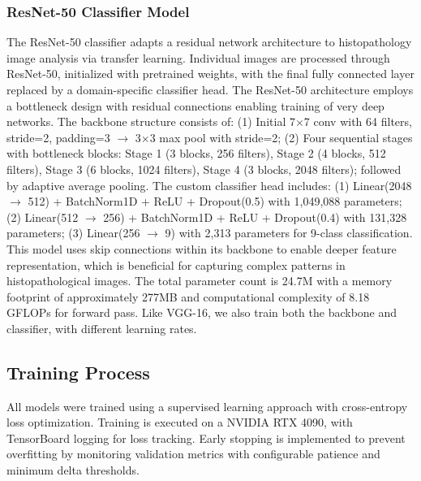 \documentclass[a4paper,12pt]{article}
\begin{document}
\subsubsection{ResNet-50 Classifier Model}
The ResNet-50 classifier adapts a residual network architecture to histopathology image analysis via transfer learning. Individual images are processed through ResNet-50, initialized with pretrained weights, with the final fully connected layer replaced by a domain-specific classifier head. The ResNet-50 architecture employs a bottleneck design with residual connections enabling training of very deep networks. The backbone structure consists of: (1) Initial 7$\times$7 conv with 64 filters, stride=2, padding=3 $\rightarrow$ 3$\times$3 max pool with stride=2; (2) Four sequential stages with bottleneck blocks: Stage 1 (3 blocks, 256 filters), Stage 2 (4 blocks, 512 filters), Stage 3 (6 blocks, 1024 filters), Stage 4 (3 blocks, 2048 filters); followed by adaptive average pooling. The custom classifier head includes: (1) Linear(2048 $\rightarrow$ 512) + BatchNorm1D + ReLU + Dropout(0.5) with 1,049,088 parameters; (2) Linear(512 $\rightarrow$ 256) + BatchNorm1D + ReLU + Dropout(0.4) with 131,328 parameters; (3) Linear(256 $\rightarrow$ 9) with 2,313 parameters for 9-class classification. This model uses skip connections within its backbone to enable deeper feature representation, which is beneficial for capturing complex patterns in histopathological images. The total parameter count is 24.7M with a memory footprint of approximately 277MB and computational complexity of 8.18 GFLOPs for forward pass. Like VGG-16, we also train both the backbone and classifier, with different learning rates.


\subsection{Training Process}
All models were trained using a supervised learning approach with cross-entropy loss optimization. Training is executed on a NVIDIA RTX 4090, with TensorBoard logging for loss tracking. Early stopping is implemented to prevent overfitting by monitoring validation metrics with configurable patience and minimum delta thresholds.
\end{document}
